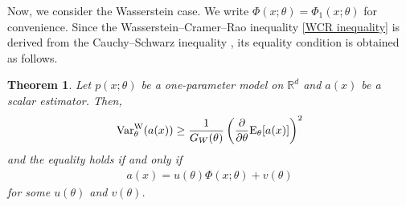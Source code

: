 \documentclass[11pt, a4paper]{article}
\newtheorem{theorem}{Theorem}
\begin{document}
Now, we consider the Wasserstein case.
We write $\Phi(x;\theta)=\Phi_1(x;\theta)$ for convenience.
Since the Wasserstein--Cramer--Rao inequality \eqref{WCR inequality} is derived from the Cauchy--Schwarz inequality \cite{WIM,affine}, its equality condition is obtained as follows.

\begin{theorem}\label{th_equality}
	Let $p(x; \theta)$ be a one-parameter model on $\mathbb{R}^d$ and $a(x)$ be a scalar estimator.
	Then,
	\begin{align*}
		{\rm Var}_{\theta}^{\mathrm{W}}(a(x)) \geq \frac{1}{ G_W(\theta)} \left( \frac{\partial}{\partial \theta} {\rm E}_{\theta}[a(x)]\right)^2
	\end{align*}
	and the equality holds if and only if 
	\begin{align*}
		a(x) = u(\theta)\Phi(x; \theta)  + v(\theta)
	\end{align*}
	for some $u(\theta)$ and $v(\theta)$.
\end{theorem}
\end{document}
